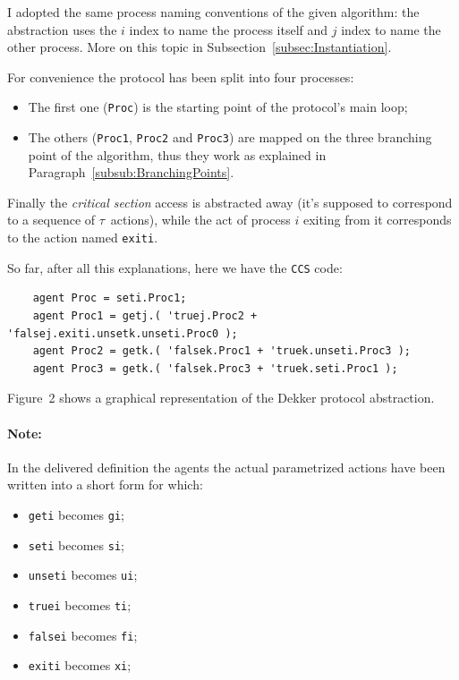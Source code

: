 \documentclass[10pt,a4paper]{article}
\newcommand{\Note}[1]{\paragraph{Note:}{#1}}
\newcommand{\CCS}{{\tt CCS}}
\newcommand{\CCSCode}[1]{{\tt #1}}
\newcommand{\Agent}[1]{{\tt {#1}}}
\begin{document}
            I adopted the same process naming conventions of the given
            algorithm: the abstraction uses the $i$ index to name the
            process itself and $j$ index to name the other process. More
            on this topic in Subsection~\ref{subsec:Instantiation}.

            For convenience the protocol has been split into four
            processes:
            \begin{itemize}
            \item   The first one (\Agent{Proc}) is the starting point of
                    the protocol's main loop;
            \item   The others (\Agent{Proc1}, \Agent{Proc2} and
                    \Agent{Proc3}) are mapped on the three branching point
                    of the algorithm, thus they work as explained in
                    Paragraph~\ref{subsub:BranchingPoints}.
            \end{itemize}

            Finally the \emph{critical section} access is abstracted away
            (it's supposed to correspond to a sequence of $\tau$~actions),
            while the act of process $i$ exiting from it corresponds to
            the action named \CCSCode{exiti}.

            So far, after all this explanations, here we have the \CCS{}
            code:
            \begin{verbatim}
    agent Proc = seti.Proc1;
    agent Proc1 = getj.( 'truej.Proc2 + 'falsej.exiti.unsetk.unseti.Proc0 );
    agent Proc2 = getk.( 'falsek.Proc1 + 'truek.unseti.Proc3 );
    agent Proc3 = getk.( 'falsek.Proc3 + 'truek.seti.Proc1 );
            \end{verbatim}

            Figure~2 shows a graphical representation of the
            Dekker protocol abstraction.

\newpage
            \Note{
                In the delivered definition the agents the actual
                parametrized actions have been written into a short form
                for which:
                \begin{multicols}{2}
                    \begin{itemize}
                    \item   \CCSCode{geti} becomes \CCSCode{gi};
                    \item   \CCSCode{seti} becomes \CCSCode{si};
                    \item   \CCSCode{unseti} becomes \CCSCode{ui};
                    \item   \CCSCode{truei} becomes \CCSCode{ti};
                    \item   \CCSCode{falsei} becomes \CCSCode{fi};
                    \item   \CCSCode{exiti} becomes \CCSCode{xi};
                    \end{itemize}
                \end{multicols}
            }
\end{document}
